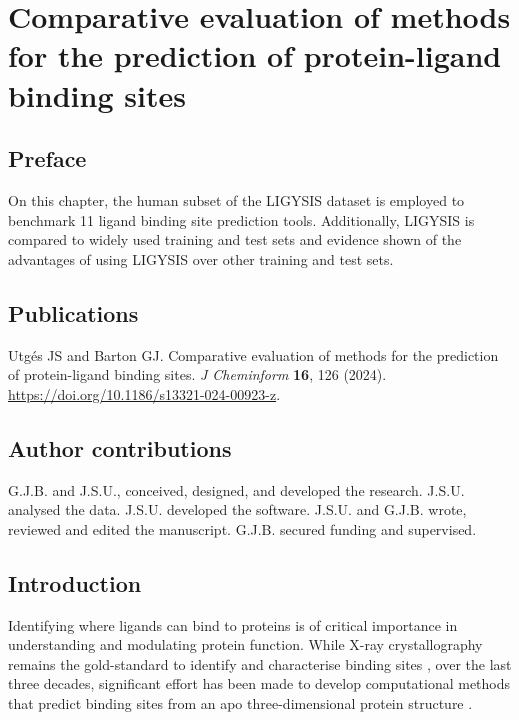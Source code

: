 \chapter{Comparative evaluation of methods for the prediction of protein-ligand binding sites}

\section*{Preface}

On this chapter, the human subset of the LIGYSIS dataset is employed to benchmark 11 ligand binding site prediction tools. Additionally, LIGYSIS is compared to widely used training and test sets and evidence shown of the advantages of using LIGYSIS over other training and test sets.

\section*{Publications}

Utgés JS and Barton GJ. Comparative evaluation of methods for the prediction of protein-ligand binding sites. \textit{J Cheminform} \textbf{16}, 126 (2024). \url{https://doi.org/10.1186/s13321-024-00923-z}. \cite{UTGES_2024_LBSCOMP}

\section*{Author contributions}

G.J.B. and J.S.U., conceived, designed, and developed the research. J.S.U. analysed the data. J.S.U. developed the software. J.S.U. and G.J.B. wrote, reviewed and edited the manuscript. G.J.B. secured funding and supervised.

\section{Introduction}

Identifying where ligands can bind to proteins is of critical importance in understanding and modulating protein function. While X-ray crystallography remains the gold-standard to identify and characterise binding sites \cite{CONGREVE_2003_RO3, REES_2004_FBLD, MURRAY_2009_FBDD, SCHIEBEL_2016_FRAGMENTS, UTGES_2024_FRAGSYS}, over the last three decades, significant  effort has been made to develop computational methods that predict binding sites from an apo three-dimensional protein structure \cite{VOLKAMER_2010_TOPOLOGY}.

